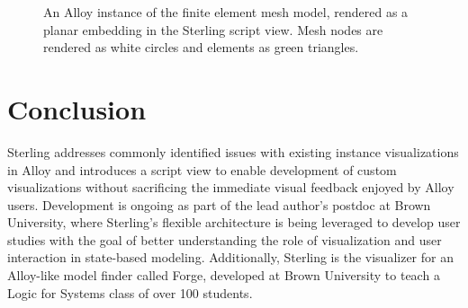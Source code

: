 \documentclass[runningheads]{llncs}
\begin{document}
\begin{figure}
    \centering
    \caption{An Alloy instance of the finite element mesh model, rendered as a planar embedding in the Sterling script view. Mesh nodes are rendered as white circles and elements as green triangles.}
    \label{fig:script}
\end{figure}


\section{Conclusion}
\label{conclusions}
Sterling addresses commonly identified issues with existing instance visualizations in Alloy and introduces a script view to enable development of custom visualizations without sacrificing the immediate visual feedback enjoyed by Alloy users.
Development is ongoing as part of the lead author's postdoc at Brown University, where Sterling's flexible architecture is being leveraged to develop user studies with the goal of better understanding the role of visualization and user interaction in state-based modeling. 
Additionally, Sterling is the visualizer for an Alloy-like model finder called Forge, developed at Brown University to teach a Logic for Systems class of over 100 students.
\end{document}
